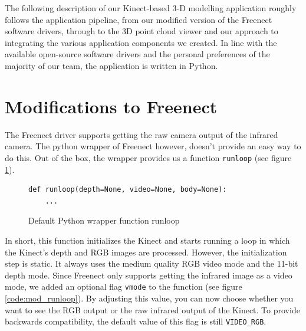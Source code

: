 

The following description of our Kinect-based 3-D modelling application roughly
follows the application pipeline, from our modified version of the Freenect
software drivers, through to the 3D point cloud viewer and our approach to
integrating the various application components we created. In line with the
available open-source software drivers and the personal preferences of the
majority of our team, the application is written in Python.


\section{Modifications to Freenect}
\label{sec:mod_to_freenect}

The Freenect driver supports getting the raw camera output of the infrared camera. The python wrapper of Freenect however, doesn't provide an easy way to do this. Out of the box, the wrapper provides us a function \verb|runloop| (see figure \ref{code:def_runloop}).

\begin{figure}[H]
\begin{lstlisting}
def runloop(depth=None, video=None, body=None):
    ...
\end{lstlisting}
\caption{Default Python wrapper function runloop}
\label{code:def_runloop}
\end{figure}

In short, this function initializes the Kinect and starts running a loop in which the Kinect's depth and RGB images are processed. However, the initialization step is static. It always uses the medium quality RGB video mode and the 11-bit depth mode. Since Freenect only supports getting the infrared image as a video mode, we added an optional flag \verb|vmode| to the function (see figure \ref{code:mod_runloop}). By adjusting this value, you can now choose whether you want to see the RGB output or the raw infrared output of the Kinect. To provide backwards compatibility, the default value of this flag is still \verb|VIDEO_RGB|.

